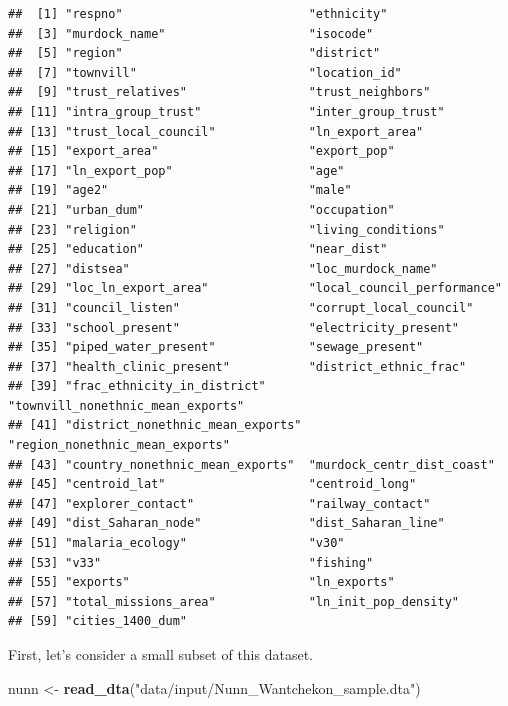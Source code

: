 \documentclass[
]{book}
\newenvironment{Shaded}{\begin{snugshade}}{\end{snugshade}}
\newcommand{\KeywordTok}[1]{\textcolor[rgb]{0.13,0.29,0.53}{\textbf{#1}}}
\newcommand{\NormalTok}[1]{#1}
\newcommand{\StringTok}[1]{\textcolor[rgb]{0.31,0.60,0.02}{#1}}
\theoremstyle{definition}
\theoremstyle{definition}
\theoremstyle{definition}
\theoremstyle{remark}
\begin{document}
\begin{verbatim}
##  [1] "respno"                          "ethnicity"                      
##  [3] "murdock_name"                    "isocode"                        
##  [5] "region"                          "district"                       
##  [7] "townvill"                        "location_id"                    
##  [9] "trust_relatives"                 "trust_neighbors"                
## [11] "intra_group_trust"               "inter_group_trust"              
## [13] "trust_local_council"             "ln_export_area"                 
## [15] "export_area"                     "export_pop"                     
## [17] "ln_export_pop"                   "age"                            
## [19] "age2"                            "male"                           
## [21] "urban_dum"                       "occupation"                     
## [23] "religion"                        "living_conditions"              
## [25] "education"                       "near_dist"                      
## [27] "distsea"                         "loc_murdock_name"               
## [29] "loc_ln_export_area"              "local_council_performance"      
## [31] "council_listen"                  "corrupt_local_council"          
## [33] "school_present"                  "electricity_present"            
## [35] "piped_water_present"             "sewage_present"                 
## [37] "health_clinic_present"           "district_ethnic_frac"           
## [39] "frac_ethnicity_in_district"      "townvill_nonethnic_mean_exports"
## [41] "district_nonethnic_mean_exports" "region_nonethnic_mean_exports"  
## [43] "country_nonethnic_mean_exports"  "murdock_centr_dist_coast"       
## [45] "centroid_lat"                    "centroid_long"                  
## [47] "explorer_contact"                "railway_contact"                
## [49] "dist_Saharan_node"               "dist_Saharan_line"              
## [51] "malaria_ecology"                 "v30"                            
## [53] "v33"                             "fishing"                        
## [55] "exports"                         "ln_exports"                     
## [57] "total_missions_area"             "ln_init_pop_density"            
## [59] "cities_1400_dum"
\end{verbatim}

First, let's consider a small subset of this dataset.

\begin{Shaded}
\begin{Highlighting}[]
\NormalTok{nunn <{-}}\StringTok{ }\KeywordTok{read\_dta}\NormalTok{(}\StringTok{"data/input/Nunn\_Wantchekon\_sample.dta"}\NormalTok{)}
\end{Highlighting}
\end{Shaded}
\end{document}
